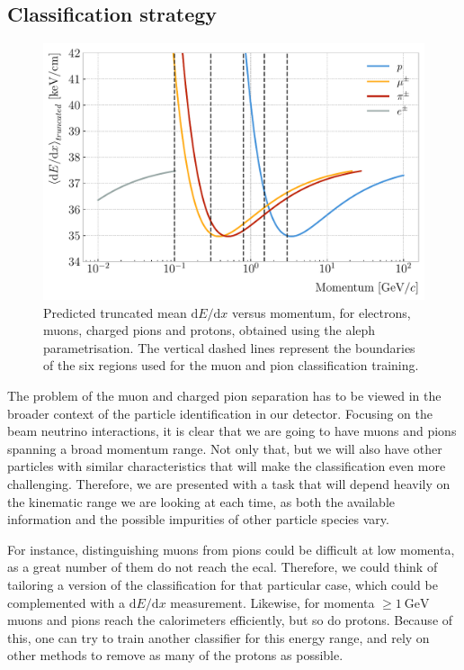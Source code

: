 \subsection{Classification strategy}

\begin{figure}[t]
	\centering
	\includegraphics[width=.80\linewidth]{Images/GArSoft_PID/BDT/dEdx_fit_only.pdf}
	\caption[Predicted truncated $\expval{\mathrm{d}E/\mathrm{d}x}$ versus momentum, for electrons, muons, charged pions and protons, obtained using the \gls{aleph} parametrisation]{Predicted truncated mean $\mathrm{d}E/\mathrm{d}x$ versus momentum, for electrons, muons, charged pions and protons, obtained using the \gls{aleph} parametrisation. The vertical dashed lines represent the boundaries of the six regions used for the muon and pion classification training.}
	\label{fig:dEdx_vs_momentum_regions}
\end{figure}

The problem of the muon and charged pion separation has to be viewed in the broader context of the particle identification in our detector. Focusing on the beam neutrino interactions, it is clear that we are going to have muons and pions spanning a broad momentum range. Not only that, but we will also have other particles with similar characteristics that will make the classification even more challenging. Therefore, we are presented with a task that will depend heavily on the kinematic range we are looking at each time, as both the available information and the possible impurities of other particle species vary.

For instance, distinguishing muons from pions could be difficult at low momenta, as a great number of them do not reach the \gls{ecal}. Therefore, we could think of tailoring a version of the classification for that particular case, which could be complemented with a $\mathrm{d}E/\mathrm{d}x$ measurement. Likewise, for momenta $\geq 1~\mathrm{GeV}$ muons and pions reach the calorimeters efficiently, but so do protons. Because of this, one can try to train another classifier for this energy range, and rely on other methods to remove as many of the protons as possible.

